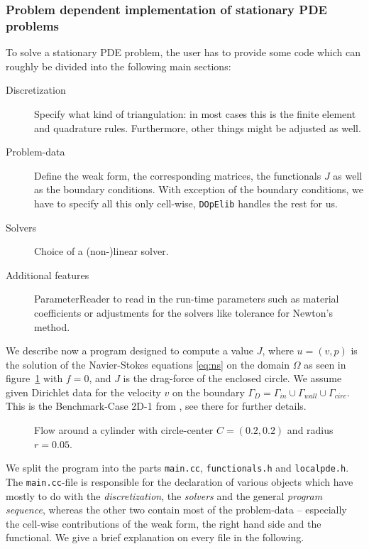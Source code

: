 \documentclass[smallextended]{svjour3}       %
\numberwithin{equation}{section}
\newcommand{\dope}{\texttt{DOpElib}}
\begin{document}
\subsubsection{Problem dependent implementation of stationary PDE problems}
To solve a stationary PDE problem, the user has to provide some code which can roughly be divided into the following main sections:
\begin{description}
\item[Discretization] Specify what kind of triangulation:
in most cases this is the
finite element and quadrature rules. Furthermore, other
things might be adjusted as well.
\item[Problem-data] Define the weak form, the corresponding matrices, the
  functionals $J$ as well as the boundary conditions. With exception of the boundary conditions, we have to specify all this only cell-wise, \dope{} handles the rest for us.
\item[Solvers] Choice of a (non-)linear solver. 
\item[Additional features] ParameterReader to read in the run-time parameters
  such as material coefficients or adjustments for the solvers like tolerance
  for Newton's method. 
\end{description} 

We describe now a program designed to compute a value $J$, where $u=(v,p)$ is the solution of the Navier-Stokes equations \eqref{eq:ns} on the domain $\Omega$ as seen in figure~\ref{fig:example_ns} with  $f=0$, and $J$ is the drag-force of the enclosed circle. We assume given Dirichlet data for the velocity $v$ on the boundary $\Gamma_{D}=\Gamma_{in}\cup\Gamma_{wall}\cup\Gamma_{circ}$. This is the Benchmark-Case 2D-1 from \cite{TuSchae96}, see there for further details.
\begin{figure}[h]
\centering
\resizebox{0.5\textwidth}{!}{}
\caption{Flow around a cylinder with 
circle-center $C=(0.2,0.2)$ and radius $r=0.05$.}
\label{fig:example_ns}
\end{figure}

We split the program into the parts \texttt{main.cc}, \texttt{functionals.h} and \texttt{localpde.h}. The \texttt{main.cc}-file is responsible for the declaration of various objects which have mostly to do with the \textit{discretization}, the \textit{solvers} and the general \textit{program sequence}, whereas the other two contain most of the problem-data -- especially the cell-wise contributions of the weak form, the right hand side and the functional. We give a brief explanation on every file in the following.
\end{document}
